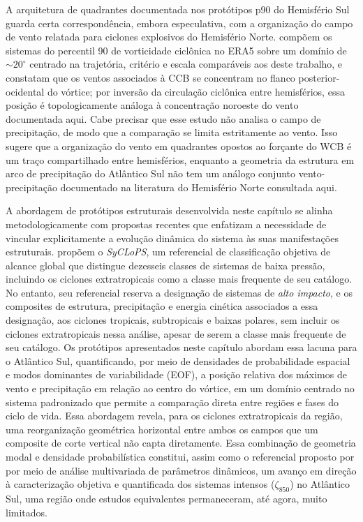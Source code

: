 A arquitetura de quadrantes documentada nos protótipos p90 do Hemisfério Sul guarda certa correspondência, embora especulativa, com a organização do campo de vento relatada para ciclones explosivos do Hemisfério Norte. \citet{priestley2022improved} compõem os sistemas do percentil 90 de vorticidade ciclônica no ERA5 sobre um domínio de ${\sim}20^{\circ}$ centrado na trajetória, critério e escala comparáveis aos deste trabalho, e constatam que os ventos associados à CCB se concentram no flanco posterior-ocidental do vórtice; por inversão da circulação ciclônica entre hemisférios, essa posição é topologicamente análoga à concentração noroeste do vento documentada aqui. Cabe precisar que esse estudo não analisa o campo de precipitação, de modo que a comparação se limita estritamente ao vento. Isso sugere que a organização do vento em quadrantes opostos ao forçante do WCB é um traço compartilhado entre hemisférios, enquanto a geometria da estrutura em arco de precipitação do Atlântico Sul não tem um análogo conjunto vento-precipitação documentado na literatura do Hemisfério Norte consultada aqui.


A abordagem de protótipos estruturais desenvolvida neste capítulo se alinha metodologicamente com propostas recentes que enfatizam a necessidade de vincular explicitamente a evolução dinâmica do sistema às suas manifestações estruturais. \citet{han2025system} propõem o \textit{SyCLoPS}, um referencial de classificação objetiva de alcance global que distingue dezesseis classes de sistemas de baixa pressão, incluindo os ciclones extratropicais como a classe mais frequente de seu catálogo. No entanto, seu referencial reserva a designação de sistemas de \textit{alto impacto}, e os composites de estrutura, precipitação e energia cinética associados a essa designação, aos ciclones tropicais, subtropicais e baixas polares, sem incluir os ciclones extratropicais nessa análise, apesar de serem a classe mais frequente de seu catálogo. Os protótipos apresentados neste capítulo abordam essa lacuna para o Atlântico Sul, quantificando, por meio de densidades de probabilidade espacial e modos dominantes de variabilidade (EOF), a posição relativa dos máximos de vento e precipitação em relação ao centro do vórtice, em um domínio centrado no sistema padronizado que permite a comparação direta entre regiões e fases do ciclo de vida. Essa abordagem revela, para os ciclones extratropicais da região, uma reorganização geométrica horizontal entre ambos os campos que um composite de corte vertical não capta diretamente. Essa combinação de geometria modal e densidade probabilística constitui, assim como o referencial proposto por \citet{corner2025classification} por meio de análise multivariada de parâmetros dinâmicos, um avanço em direção à caracterização objetiva e quantificada dos sistemas intensos ($\zeta_{850}$) no Atlântico Sul, uma região onde estudos equivalentes permaneceram, até agora, muito limitados.

